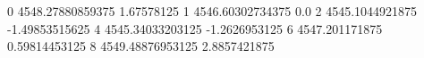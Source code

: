 0 4548.27880859375 1.67578125
1 4546.60302734375 0.0
2 4545.1044921875 -1.49853515625
4 4545.34033203125 -1.2626953125
6 4547.201171875 0.59814453125
8 4549.48876953125 2.8857421875
